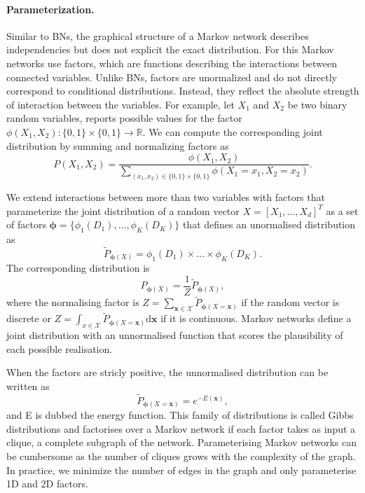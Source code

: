 \paragraph{Parameterization.}
Similar to BNs, the graphical structure of a Markov network describes independencies but does not explicit the exact distribution. For this Markov networks use factors, which are functions describing the interactions between connected variables. Unlike BNs, factors are unormalized and do not directly correspond to conditional distributions. Instead, they reflect the absolute strength of interaction between the variables. For example, let $X_1$ and $X_2$ be two binary random variables,  reports possible values for the factor $\phi(X_1, X_2): \{ 0, 1\} \times \{ 0, 1\} \rightarrow \mathbb{R}$. We can compute the corresponding joint distribution by summing and normalizing factors as
$$ P(X_1, X_2) = \frac{\phi(X_1, X_2)}{\sum_{(x_1, x_2) \in \{ 0, 1 \} \times \{ 0, 1\} } \phi(X_1=x_1, X_2=x_2)}. $$

We extend interactions between more than two variables with factors that parameterize the joint distribution of a random vector $X = \left[X_1, \hdots, X_d\right]^T$ as a set of factors $\bm{\phi} = \{ \phi_1(D_1), \dots, \phi_K(D_K) \}$ that defines an unormalised distribution as
$$ \tilde{P}_{\bm{\phi}(X)} = \phi_1(D_1) \times \dots \times \phi_K(D_K). $$
The corresponding distribution is
$$P_{\bm{\phi}(X)} = \frac{1}{Z}\tilde{P}_{\bm{\phi}(X)},$$
where the normalising factor is $Z=\sum_{\bm{x} \in \mathcal{X}}\tilde{P}_{\bm{\phi}(X=\bm{x})}$ if the random vector is discrete or $Z=\int_{x \in \mathcal{X}}\tilde{P}_{\bm{\phi}(X=\bm{x})}\text{d}\bm{x}$ if it is continuous. Markov networks define a joint distribution with an unnormalised function that scores the plausibility of each possible realisation.

When the factors are stricly positive, the unnormalised distribution can be written as $$ \tilde{P}_{\bm{\phi}(X=\bm{x})} = e^{-E(\bm{x})}, $$ and E is dubbed the energy function. This family of distributions is called Gibbs distributions and factorises over a Markov network if each factor takes as input a clique, a complete subgraph of the network. Parameterising Markov networks can be cumbersome as the number of cliques grows with the complexity of the graph. In practice, we minimize the number of edges in the graph and only parameterise 1D and 2D factors.

